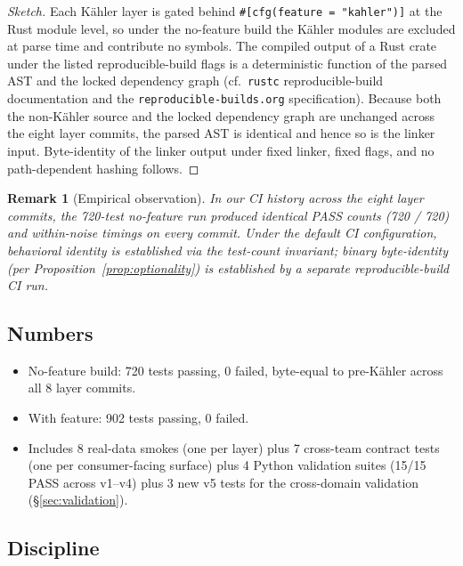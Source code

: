 \documentclass[11pt,letterpaper]{article}
\newtheorem{remark}[theorem]{Remark}
\begin{document}
\begin{proof}[Sketch]
Each K\"ahler layer is gated behind
\verb|#[cfg(feature = "kahler")]| at the Rust module level, so
under the no-feature build the K\"ahler modules are excluded at
parse time and contribute no symbols. The compiled output of a
Rust crate under the listed reproducible-build flags is a
deterministic function of the parsed AST and the locked dependency
graph (cf.\ \texttt{rustc} reproducible-build documentation and the
\texttt{reproducible-builds.org} specification). Because both the
non-K\"ahler source and the locked dependency graph are unchanged
across the eight layer commits, the parsed AST is identical and
hence so is the linker input. Byte-identity of the linker output
under fixed linker, fixed flags, and no path-dependent hashing
follows.
\end{proof}

\begin{remark}[Empirical observation]
\label{rem:optionality-empirical}
In our CI history across the eight layer commits, the 720-test
no-feature run produced identical PASS counts (720 / 720) and
within-noise timings on every commit. Under the default CI
configuration, behavioral identity is established via the
test-count invariant; binary byte-identity (per
Proposition~\ref{prop:optionality}) is established by a separate
reproducible-build CI run.
\end{remark}

\subsection{Numbers}

\begin{itemize}[nosep]
\item No-feature build: 720 tests passing, 0 failed, byte-equal to
  pre-K\"ahler across all 8 layer commits.
\item With feature: 902 tests passing, 0 failed.
\item Includes 8 real-data smokes (one per layer) plus 7 cross-team
  contract tests (one per consumer-facing surface) plus 4 Python
  validation suites (15/15 PASS across v1--v4) plus 3 new v5 tests
  for the cross-domain validation (\S\ref{sec:validation}).
\end{itemize}

\subsection{Discipline}
\end{document}
